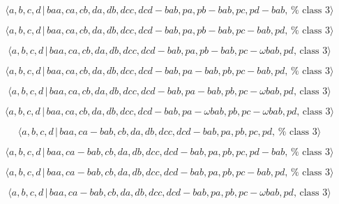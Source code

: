 \documentclass[10pt]{article}
\begin{document}
\begin{equation}
\langle a,b,c,d\,|\,baa,ca,cb,da,db,dcc,dcd-bab,pa,pb-bab,pc,pd-bab,\,\text{%
class }3\rangle  \tag{7.4106}
\end{equation}

\begin{equation}
\langle a,b,c,d\,|\,baa,ca,cb,da,db,dcc,dcd-bab,pa,pb-bab,pc-bab,pd,\,\text{%
class }3\rangle  \tag{7.4107}
\end{equation}

\begin{equation}
\langle a,b,c,d\,|\,baa,ca,cb,da,db,dcc,dcd-bab,pa,pb-bab,pc-\omega bab,pd,\,%
\text{class }3\rangle  \tag{7.4108}
\end{equation}

\begin{equation}
\langle a,b,c,d\,|\,baa,ca,cb,da,db,dcc,dcd-bab,pa-bab,pb,pc-bab,pd,\,\text{%
class }3\rangle  \tag{7.4109}
\end{equation}

\begin{equation}
\langle a,b,c,d\,|\,baa,ca,cb,da,db,dcc,dcd-bab,pa-bab,pb,pc-\omega bab,pd,\,%
\text{class }3\rangle  \tag{7.4110}
\end{equation}

\begin{equation}
\langle a,b,c,d\,|\,baa,ca,cb,da,db,dcc,dcd-bab,pa-\omega bab,pb,pc-\omega
bab,pd,\,\text{class }3\rangle  \tag{7.4111}
\end{equation}

\begin{equation}
\langle a,b,c,d\,|\,baa,ca-bab,cb,da,db,dcc,dcd-bab,pa,pb,pc,pd,\,\text{%
class }3\rangle  \tag{7.4112}
\end{equation}

\begin{equation}
\langle a,b,c,d\,|\,baa,ca-bab,cb,da,db,dcc,dcd-bab,pa,pb,pc,pd-bab,\,\text{%
class }3\rangle  \tag{7.4113}
\end{equation}

\begin{equation}
\langle a,b,c,d\,|\,baa,ca-bab,cb,da,db,dcc,dcd-bab,pa,pb,pc-bab,pd,\,\text{%
class }3\rangle  \tag{7.4114}
\end{equation}

\begin{equation}
\langle a,b,c,d\,|\,baa,ca-bab,cb,da,db,dcc,dcd-bab,pa,pb,pc-\omega bab,pd,\,%
\text{class }3\rangle  \tag{7.4115}
\end{equation}
\end{document}
